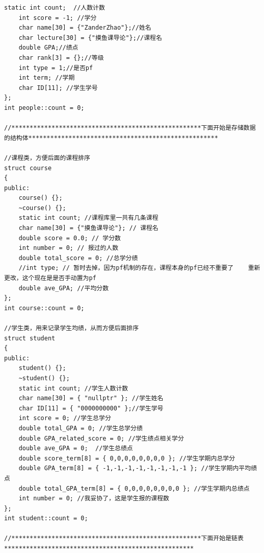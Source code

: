 \documentclass[fontset=windows]{article}
\begin{document}
\begin{lstlisting}[style = {cppstyle}]
	static int count;  //人数计数
	int score = -1; //学分
	char name[30] = {"ZanderZhao"};//姓名
	char lecture[30] = {"摸鱼课导论"};//课程名
	double GPA;//绩点
	char rank[3] = {};//等级
	int type = 1;//是否pf
	int term; //学期
	char ID[11]; //学生学号
};
int people::count = 0;

//****************************************************下面开始是存储数据的结构体****************************************************

//课程类，方便后面的课程排序
struct course
{
public:
	course() {};
	~course() {};
	static int count; //课程库里一共有几条课程
	char name[30] = {"摸鱼课导论"}; // 课程名
	double score = 0.0; // 学分数
	int number = 0; // 报过的人数
	double total_score = 0; //总学分绩
	//int type; // 暂时去掉，因为pf机制的存在，课程本身的pf已经不重要了    重新更改，这个现在是是否手动置为pf
	double ave_GPA; //平均分数
};
int course::count = 0;

//学生类，用来记录学生均绩，从而方便后面排序
struct student
{
public:
	student() {};
	~student() {};
	static int count; //学生人数计数
	char name[30] = { "nullptr" }; //学生姓名
	char ID[11] = { "0000000000" };//学生学号
	int score = 0; //学生总学分
	double total_GPA = 0; //学生总学分绩
	double GPA_related_score = 0; //学生绩点相关学分
	double ave_GPA = 0;  //学生总绩点
	double score_term[8] = { 0,0,0,0,0,0,0,0 }; //学生学期内总学分
	double GPA_term[8] = { -1,-1,-1,-1,-1,-1,-1,-1 }; //学生学期内平均绩点
	double total_GPA_term[8] = { 0,0,0,0,0,0,0,0 }; //学生学期内总绩点
	int number = 0; //我妥协了，这是学生报的课程数
};
int student::count = 0;

//****************************************************下面开始是链表****************************************************


\end{lstlisting}
\end{document}
